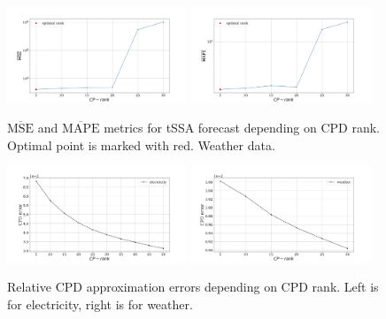 	\begin{figure}[h]
		\centering
		\includegraphics[width=0.48\textwidth, keepaspectratio]{../../experiments/weather/tssa/figs/prediction/MSE_rank.png}
		\includegraphics[width=0.48\textwidth, keepaspectratio]{../../experiments/weather/tssa/figs/prediction/MAPE_rank.png}
		\caption{$ \overline{\text{MSE}} $ and $ \overline{\text{MAPE}} $ metrics for tSSA forecast depending on CPD rank. Optimal point is marked with red. Weather data.}\label{fig:mse_mape_weather}
	\end{figure}
	
	\begin{figure}[h]
		\centering
		\includegraphics[width=0.48\textwidth, keepaspectratio]{../../experiments/electricity/tssa/figs/CPD_error.png}
		\includegraphics[width=0.48\textwidth, keepaspectratio]{../../experiments/weather/tssa/figs/CPD_error.png}
		\caption{Relative CPD approximation errors depending on CPD rank. Left is for electricity, right is for weather.}\label{fig:cpd_errors}
	\end{figure}
	
